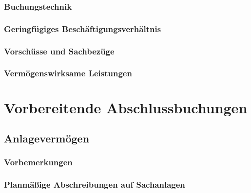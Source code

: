 \documentclass[paper=a4, fontsize=11pt]{scrartcl}
\numberwithin{equation}{section}
\numberwithin{figure}{section}
\numberwithin{table}{section}
\begin{document}

\subsubsection{Buchungstechnik}


\subsubsection{Geringfügiges Beschäftigungsverhältnis}


\subsubsection{Vorschüsse und Sachbezüge}


\subsubsection{Vermögenswirksame Leistungen}


\newpage

\section{Vorbereitende Abschlussbuchungen}


\subsection{Anlagevermögen}


\subsubsection{Vorbemerkungen}


\subsubsection{Planmäßige Abschreibungen auf Sachanlagen}
\end{document}
